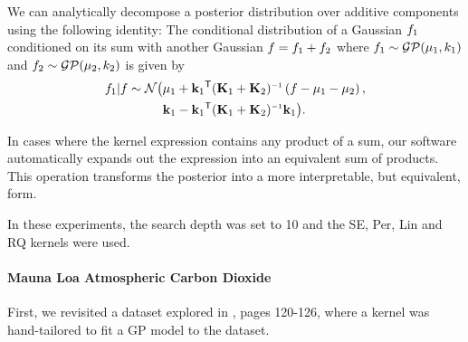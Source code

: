 \documentclass[twoside]{article}
\begin{document}

\label{sec:decomposing}
We can analytically decompose a \gp{} posterior distribution over additive components using the following identity:
The conditional distribution of a Gaussian $f_1$ conditioned on its sum with another Gaussian $f = f_1 + f_2$ where $f_1 \sim \mathcal{GP}( {\bf{\mu}}_1, k_1)$ and $f_2 \sim \mathcal{GP}( {\bf{\mu}}_2, k_2)$ is given by
\begin{align}
\function_1 | \function \sim \mathcal{N} \big( & \vmu_1 + \vk_1\tra (\vK_1 + \vK_2)\inv \left( \function - \vmu_1 - \vmu_2 \right), \nonumber \\
& \vk_1 - \vk_1\tra (\vK_1 + \vK_2)\inv \vk_1 \big).
\end{align}

In cases where the kernel expression contains any product of a sum, our software automatically expands out the expression into an equivalent sum of products.  This operation transforms the posterior into a more interpretable, but equivalent, form.

In these experiments, the search depth was set to 10 and the SE, Per, Lin and RQ kernels were used.

\label{sec:extrapolation}
\paragraph{Mauna Loa Atmospheric Carbon Dioxide}

First, we revisited a dataset explored in \cite{rasmussen38gaussian}, pages 120-126, where a kernel was hand-tailored to fit a GP model to the dataset.

\end{document}
